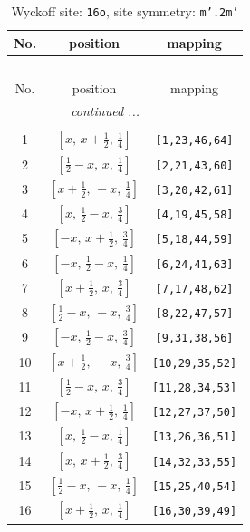 \documentclass[fleqn,8pt]{jsarticle}
\begin{document}
\renewcommand{\arraystretch}{1.2}
\begin{longtable}{ccc}
\caption{Wyckoff site: {\tt 16o}, site symmetry: {\tt m'.2m'}}
 \\
 \hline \hline
No. & position & mapping \\ \hline \endfirsthead

\multicolumn{2}{l}{\tablename\ \thetable{}} \\
 \hline \hline
No. & position & mapping \\ \hline \endhead

 \hline \hline
\multicolumn{2}{r}{\footnotesize\it continued ...} \\ \endfoot

 \hline \hline
\multicolumn{2}{r}{} \\ \endlastfoot

1 & $\left[ x,\, x + \frac{1}{2},\, \frac{1}{4} \right]$ & {\tt [1,23,46,64]} \\ \hline
2 & $\left[ \frac{1}{2} - x,\, x,\, \frac{1}{4} \right]$ & {\tt [2,21,43,60]} \\ \hline
3 & $\left[ x + \frac{1}{2},\, - x,\, \frac{1}{4} \right]$ & {\tt [3,20,42,61]} \\ \hline
4 & $\left[ x,\, \frac{1}{2} - x,\, \frac{3}{4} \right]$ & {\tt [4,19,45,58]} \\ \hline
5 & $\left[ - x,\, x + \frac{1}{2},\, \frac{3}{4} \right]$ & {\tt [5,18,44,59]} \\ \hline
6 & $\left[ - x,\, \frac{1}{2} - x,\, \frac{1}{4} \right]$ & {\tt [6,24,41,63]} \\ \hline
7 & $\left[ x + \frac{1}{2},\, x,\, \frac{3}{4} \right]$ & {\tt [7,17,48,62]} \\ \hline
8 & $\left[ \frac{1}{2} - x,\, - x,\, \frac{3}{4} \right]$ & {\tt [8,22,47,57]} \\ \hline
9 & $\left[ - x,\, \frac{1}{2} - x,\, \frac{3}{4} \right]$ & {\tt [9,31,38,56]} \\ \hline
10 & $\left[ x + \frac{1}{2},\, - x,\, \frac{3}{4} \right]$ & {\tt [10,29,35,52]} \\ \hline
11 & $\left[ \frac{1}{2} - x,\, x,\, \frac{3}{4} \right]$ & {\tt [11,28,34,53]} \\ \hline
12 & $\left[ - x,\, x + \frac{1}{2},\, \frac{1}{4} \right]$ & {\tt [12,27,37,50]} \\ \hline
13 & $\left[ x,\, \frac{1}{2} - x,\, \frac{1}{4} \right]$ & {\tt [13,26,36,51]} \\ \hline
14 & $\left[ x,\, x + \frac{1}{2},\, \frac{3}{4} \right]$ & {\tt [14,32,33,55]} \\ \hline
15 & $\left[ \frac{1}{2} - x,\, - x,\, \frac{1}{4} \right]$ & {\tt [15,25,40,54]} \\ \hline
16 & $\left[ x + \frac{1}{2},\, x,\, \frac{1}{4} \right]$ & {\tt [16,30,39,49]} \\
\end{longtable}
\end{document}
